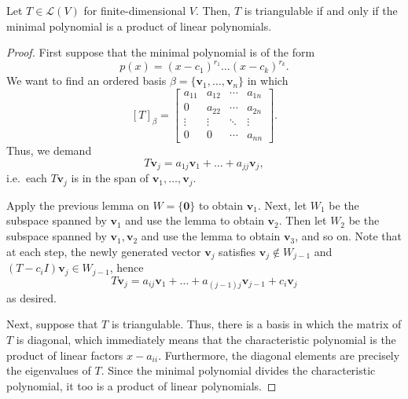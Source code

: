 \documentclass[11pt]{article}
\renewcommand{\vec}[1]{\boldsymbol{#1}}
\newcommand{\vv}{\vec{v}}
\newcommand{\alg}[1]{\mathscr{#1}}
\theoremstyle{definition}
\theoremstyle{remark}
\numberwithin{equation}{section}
\begin{document}
    \begin{theorem}
        Let $T \in \alg{L}(V)$ for finite-dimensional $V$. Then, $T$ is triangulable
        if and only if the minimal polynomial is a product of linear polynomials.
    \end{theorem}
    \begin{proof}
        First suppose that the minimal polynomial is of the form \[
            p(x) = (x - c_1)^{r_1} \dots (x - c_k)^{r_k}.
        \] We want to find an ordered basis $\beta = \{\vv_1, \dots, \vv_n\}$ in
        which \[
            [T]_\beta = \begin{bmatrix}
                a_{11} & a_{12} & \cdots & a_{1n} \\
                0      & a_{22} & \cdots & a_{2n} \\
                \vdots & \vdots & \ddots & \vdots \\
                0      & 0      & \cdots & a_{nn}
            \end{bmatrix}.
        \] Thus, we demand \[
            T\vv_j = a_{1j}\vv_1 + \dots + a_{jj}\vv_j,
        \] i.e.\ each $T\vv_j$ is in the span of $\vv_1, \dots, \vv_j$.

        Apply the previous lemma on $W = \{\vec{0}\}$ to obtain $\vv_1$. Next, let
        $W_1$ be the subspace spanned by $\vv_1$ and use the lemma to obtain
        $\vv_2$. Then let $W_2$ be the subspace spanned by $\vv_1, \vv_2$ and
        use the lemma to obtain $\vv_3$, and so on. Note that at each step, the newly
        generated vector $\vv_j$ satisfies $\vv_j \notin W_{j - 1}$ and $(T -
        c_iI)\vv_j \in W_{j - 1}$, hence \[
            T\vv_j = a_{ij}\vv_1 + \dots + a_{(j-1)j}\vv_{j - 1} + c_i\vv_j
        \] as desired.

        Next, suppose that $T$ is triangulable. Thus, there is a basis in which the
        matrix of $T$ is diagonal, which immediately means that the characteristic
        polynomial is the product of linear factors $x - a_{ii}$. Furthermore, the
        diagonal elements are precisely the eigenvalues of $T$. Since the minimal
        polynomial divides the characteristic polynomial, it too is a product of
        linear polynomials.
    \end{proof}


    
\end{document}
